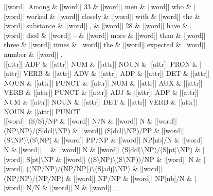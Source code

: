 \documentclass[10pt,a4paper]{article}
\begin{document}
\begin{figure}[h]
{\begin{dependency}[theme = simple]
\begin{deptext}[column sep=1em, row sep=0.1em]
|[word]| Among \& |[word]| 33 \& |[word]| men \& |[word]| who \& |[word]| worked \& |[word]| closely \& |[word]| with \& |[word]| the \& |[word]| substance \& |[word]| , \& |[word]| 28 \& |[word]| have \& |[word]| died \& |[word]| -- \& |[word]| more \& |[word]| than \& |[word]| three \& |[word]| times \& |[word]| the \& |[word]| expected \& |[word]| number \& |[word]| . \\
|[attr]| ADP \& |[attr]| NUM \& |[attr]| NOUN \& |[attr]| PRON \& |[attr]| VERB \& |[attr]| ADV \& |[attr]| ADP \& |[attr]| DET \& |[attr]| NOUN \& |[attr]| PUNCT \& |[attr]| NUM \& |[attr]| AUX \& |[attr]| VERB \& |[attr]| PUNCT \& |[attr]| ADJ \& |[attr]| ADP \& |[attr]| NUM \& |[attr]| NOUN \& |[attr]| DET \& |[attr]| VERB \& |[attr]| NOUN \& |[attr]| PUNCT \\
|[word]| (S/S)/NP \& |[word]| N/N \& |[word]| N \& |[word]| (NP\textbackslash{}NP)/(S{[}dcl{]}\textbackslash{}NP) \& |[word]| (S{[}dcl{]}\textbackslash{}NP)/PP \& |[word]| (S\textbackslash{}NP)\textbackslash{}(S\textbackslash{}NP) \& |[word]| PP/NP \& |[word]| NP{[}nb{]}/N \& |[word]| N \& |[word]| \_ \& |[word]| N \& |[word]| (S{[}dcl{]}\textbackslash{}NP)/(S{[}pt{]}\textbackslash{}NP) \& |[word]| S{[}pt{]}\textbackslash{}NP \& |[word]| ((S\textbackslash{}NP)\textbackslash{}(S\textbackslash{}NP))/NP \& |[word]| N \& |[word]| ((NP/NP)/(NP/NP))\textbackslash{}(S{[}adj{]}\textbackslash{}NP) \& |[word]| (NP/NP)/(NP/NP) \& |[word]| NP/NP \& |[word]| NP{[}nb{]}/N \& |[word]| N/N \& |[word]| N \& |[word]| \_ \\
\end{deptext}




\end{dependency}}
\end{figure}
\end{document}
